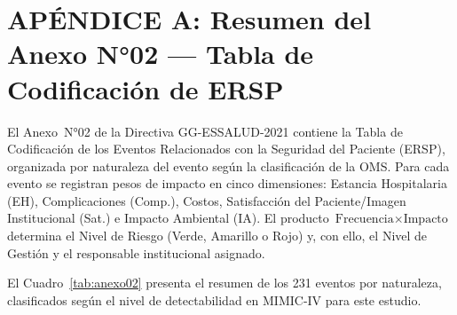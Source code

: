 \documentclass[12pt,a4paper,oneside]{book}
\begin{document}
\chapter*{APÉNDICE A: Resumen del Anexo N°02 --- Tabla de Codificación de ERSP}

El Anexo~N°02 de la Directiva GG-ESSALUD-2021 contiene la Tabla de Codificación de los Eventos Relacionados con la Seguridad del Paciente (ERSP), organizada por naturaleza del evento según la clasificación de la OMS. Para cada evento se registran pesos de impacto en cinco dimensiones: Estancia Hospitalaria (EH), Complicaciones (Comp.), Costos, Satisfacción del Paciente/Imagen Institucional (Sat.) e Impacto Ambiental (IA). El producto $\text{Frecuencia} \times \text{Impacto}$ determina el Nivel de Riesgo (Verde, Amarillo o Rojo) y, con ello, el Nivel de Gestión y el responsable institucional asignado.

El Cuadro~\ref{tab:anexo02} presenta el resumen de los 231 eventos por naturaleza, clasificados según el nivel de detectabilidad en MIMIC-IV para este estudio.
\end{document}
